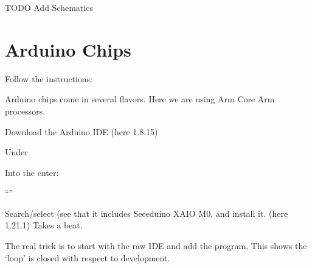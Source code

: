 \documentclass[letterpaper,10pt,english,openany,oneside]{sphinxmanual}
\begin{document}
\sphinxAtStartPar
TODO Add Schematics


\chapter{Arduino Chips}
\label{\detokenize{arduino:arduino-chips}}\label{\detokenize{arduino::doc}}
\sphinxAtStartPar
Follow the instructions:

\sphinxAtStartPar
{}

\sphinxAtStartPar
Arduino chips come in several flavors. Here we are using Arm \sphinxhyphen{}Core Arm processors.

\sphinxAtStartPar
Download the Arduino IDE (here 1.8.15)

\sphinxAtStartPar
Under 

\sphinxAtStartPar
Into the  enter:

\sphinxAtStartPar
“”

\sphinxAtStartPar
{}

\sphinxAtStartPar
Search/select  (see that it includes
Seeeduino XAIO M0, and install it. (here 1.21.1) Takes a beat.

\sphinxAtStartPar
The real trick is to start with the raw IDE and add the 
program. This shows the ‘loop’ is closed with respect to development.
\end{document}
